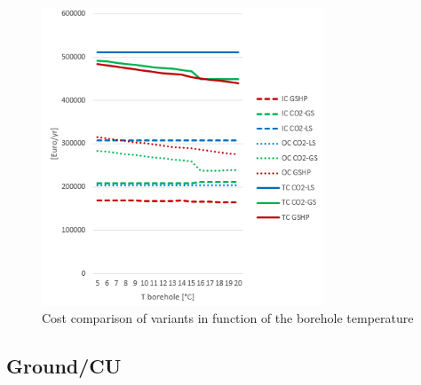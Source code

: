 \documentclass{article}
\begin{document}
\begin{figure}[htp]
	\centering
	\includegraphics[width=0.75\textwidth]{V_SA_Tg.png}
	\caption{Cost comparison of variants in function of the borehole temperature}
	\label{fig:V_SA_Tg}
\end{figure}

\subsection{Ground/CU}
\end{document}
